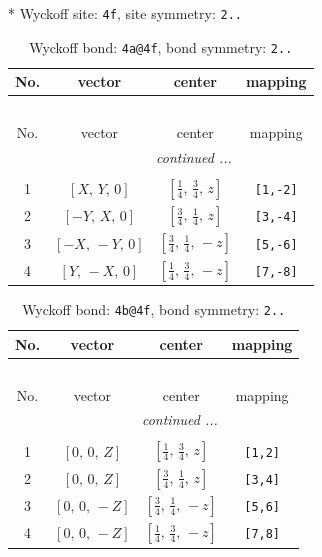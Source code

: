 \documentclass[fleqn,8pt]{jsarticle}
\begin{document}
* Wyckoff site: {\tt 4f}, site symmetry: {\tt 2..}
\renewcommand{\arraystretch}{1.2}
\begin{longtable}{cccc}
\caption{Wyckoff bond: {\tt 4a@4f}, bond symmetry: {\tt 2..}}
 \\
 \hline \hline
No. & vector & center & mapping \\ \hline \endfirsthead

\multicolumn{3}{l}{\tablename\ \thetable{}} \\
 \hline \hline
No. & vector & center & mapping \\ \hline \endhead

 \hline \hline
\multicolumn{3}{r}{\footnotesize\it continued ...} \\ \endfoot

 \hline \hline
\multicolumn{3}{r}{} \\ \endlastfoot

1 & $\left[ X,\, Y,\, 0 \right]$ & $\left[ \frac{1}{4},\, \frac{3}{4},\, z \right]$ & {\tt [1,-2]} \\ \hline
2 & $\left[ - Y,\, X,\, 0 \right]$ & $\left[ \frac{3}{4},\, \frac{1}{4},\, z \right]$ & {\tt [3,-4]} \\ \hline
3 & $\left[ - X,\, - Y,\, 0 \right]$ & $\left[ \frac{3}{4},\, \frac{1}{4},\, - z \right]$ & {\tt [5,-6]} \\ \hline
4 & $\left[ Y,\, - X,\, 0 \right]$ & $\left[ \frac{1}{4},\, \frac{3}{4},\, - z \right]$ & {\tt [7,-8]} \\
\end{longtable}
\renewcommand{\arraystretch}{1.2}
\begin{longtable}{cccc}
\caption{Wyckoff bond: {\tt 4b@4f}, bond symmetry: {\tt 2..}}
 \\
 \hline \hline
No. & vector & center & mapping \\ \hline \endfirsthead

\multicolumn{3}{l}{\tablename\ \thetable{}} \\
 \hline \hline
No. & vector & center & mapping \\ \hline \endhead

 \hline \hline
\multicolumn{3}{r}{\footnotesize\it continued ...} \\ \endfoot

 \hline \hline
\multicolumn{3}{r}{} \\ \endlastfoot

1 & $\left[ 0,\, 0,\, Z \right]$ & $\left[ \frac{1}{4},\, \frac{3}{4},\, z \right]$ & {\tt [1,2]} \\ \hline
2 & $\left[ 0,\, 0,\, Z \right]$ & $\left[ \frac{3}{4},\, \frac{1}{4},\, z \right]$ & {\tt [3,4]} \\ \hline
3 & $\left[ 0,\, 0,\, - Z \right]$ & $\left[ \frac{3}{4},\, \frac{1}{4},\, - z \right]$ & {\tt [5,6]} \\ \hline
4 & $\left[ 0,\, 0,\, - Z \right]$ & $\left[ \frac{1}{4},\, \frac{3}{4},\, - z \right]$ & {\tt [7,8]} \\
\end{longtable}
\end{document}
